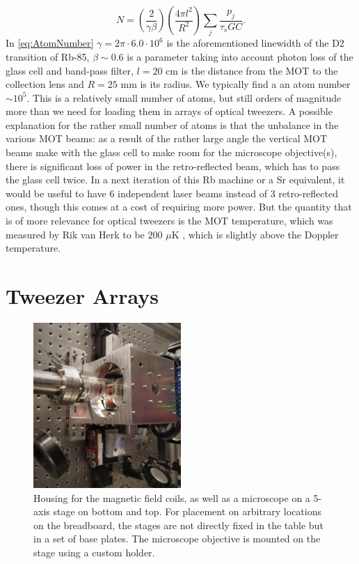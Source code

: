  \begin{equation}\label{eq:AtomNumber}
     N = \left( \frac{2}{\gamma\beta}\right)
     \left(\frac{4\pi l^2}{R^2}\right)
     \sum_j \frac{p_j}{\tau_s G C}.
 \end{equation}
In \cref{eq:AtomNumber} $\gamma = 2\pi \cdot 6.0 \cdot 10^6$ is the aforementioned linewidth of the D2 transition of Rb-85, $\beta \sim 0.6$ is a parameter taking into account photon loss of the glass cell and band-pass filter, $l = 20$ cm is the distance from the MOT to the collection lens and $R = 25$ mm is its radius. 
We typically find a an atom number $\sim 10^5$.
This is a relatively small number of atoms, but still orders of magnitude more than we need for loading them in arrays of optical tweezers. 
A possible explanation for the rather small number of atoms is that the unbalance in the various MOT beams: as a result of the rather large angle the vertical MOT beams make with the glass cell to make room for the microscope objective(s), there is significant loss of power in the retro-reflected beam, which has to pass the glass cell twice. 
In a next iteration of this Rb machine or a Sr equivalent, it would be useful to have 6 independent laser beams instead of 3 retro-reflected ones, though this comes at a cost of requiring more power. 
But the quantity that is of more relevance for optical tweezers is the MOT temperature, which was measured by Rik van Herk to be $200$ $\mu$K \cite{Herk2022}, which is slightly above the Doppler temperature. 
 
 


\section{Tweezer Arrays}\label{sec:Tweezers}

\begin{figure}
    \centering
    \includegraphics[width=0.5\textwidth]{figures/Coils.jpg}
    \caption{Housing for the magnetic field coils, as well as a microscope on a 5-axis stage on bottom and top. 
    For placement on arbitrary locations on the breadboard, the stages are not directly fixed in the table but in a set of base plates. 
    The microscope objective is mounted on the stage using a custom holder.}
    \label{fig:Coils}
\end{figure}



